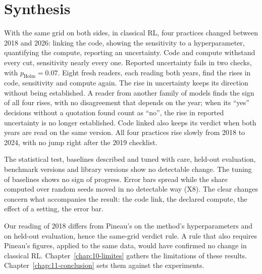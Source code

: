 \section{Synthesis}\label{sec:sr-synthese}

With the same grid on both sides, in classical RL, four practices changed between 2018 and 2026:
linking the code, showing the sensitivity to a hyperparameter, quantifying the compute, reporting an
uncertainty. Code and compute withstand every cut, sensitivity nearly every one. Reported uncertainty
fails in two checks, with $p_{\text{Holm}} = 0.07$. Eight fresh readers, each reading both years, find
the rises in code, sensitivity and compute again. The rise in uncertainty keeps its direction without
being established. A reader from another family of models finds the sign of all four rises, with no
disagreement that depends on the year; when its \enquote{yes} decisions without a quotation found count
as \enquote{no}, the rise in reported uncertainty is no longer established. Code linked also keeps its verdict when both years are read on the same version.
All four practices rise slowly from 2018 to 2024, with no jump right after the 2019 checklist.

The statistical test, baselines described and tuned with care, held-out evaluation, benchmark versions
and library versions show no detectable change. The tuning of baselines shows no sign of progress. Error bars
spread while the share computed over random seeds moved in no detectable way (X8). The clear changes
concern what accompanies the result: the code link, the declared compute, the effect of a setting, the
error bar.

Our reading of 2018 differs from Pineau's on the method's hyperparameters and on held-out evaluation,
hence the same-grid verdict rule. A rule that also requires Pineau's figures, applied to the same data, would have
confirmed no change in classical RL. Chapter~\ref{chap:10-limites} gathers the limitations of these
results. Chapter~\ref{chap:11-conclusion} sets them against the experiments.
